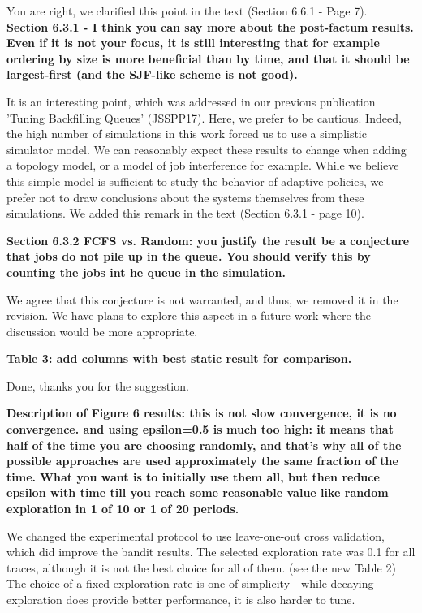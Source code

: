 \documentclass[]{article}
\begin{document}
You are right, we clarified this point in the text (Section 6.6.1 - Page 7).\\

\textbf{Section 6.3.1 - I think you can say more about the post-factum results.  Even
if it is not your focus, it is still interesting that for example ordering
by size is more beneficial than by time, and that it should be
largest-first (and the SJF-like scheme is not good).}

It is an interesting point, which was addressed in our previous publication
'Tuning Backfilling Queues' (JSSPP17). Here, we prefer to be cautious. Indeed,
the high number of simulations in this work forced us to use a simplistic
simulator model. We can reasonably expect these results to change when adding
a topology model, or a model of job interference for example. While we believe
this simple model is sufficient to study the behavior of adaptive policies, we
prefer not to draw conclusions about the systems themselves from these
simulations. We added this remark in the text (Section 6.3.1 - page 10).

\medskip

  \textbf{Section 6.3.2 FCFS vs. Random: you justify the result be a conjecture that jobs do not pile up in the queue.  
  You should verify this by counting the jobs int he queue in the simulation.}

We agree that this conjecture is not warranted, and thus, we removed it in the revision.
We have plans to explore this aspect in a future work where the
discussion would be more appropriate.
\medskip

\textbf{Table 3: add columns with best static result for comparison.}

Done, thanks you for the suggestion.
\medskip

\textbf{Description of Figure 6 results: this is not slow convergence, it is no
convergence.  and using epsilon=0.5 is much too high: it means that half of the
time you are choosing randomly, and that's why all of the possible approaches
are used approximately the same fraction of the time. What you want is to
initially use them all, but then reduce epsilon with time till you reach some
reasonable value like random exploration in 1 of 10 or 1 of 20 periods.}

We changed the experimental protocol to use leave-one-out cross validation,
which did improve the bandit results. The selected exploration rate was 0.1 for
all traces, although it is not the best choice for all of them. (see the new
Table 2) The choice of a fixed exploration rate is one of simplicity - while
decaying exploration does provide better performance, it is also harder to
tune.
\medskip
\end{document}

